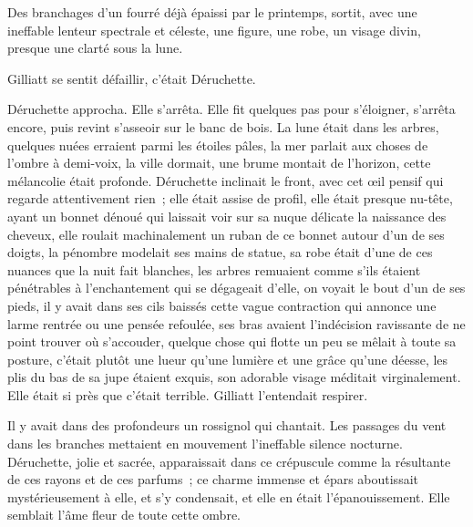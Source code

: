 \documentclass[french,twoside]{book} %
\begin{document}
Des branchages d’un fourré déjà épaissi par le printemps, sortit, avec une ineffable lenteur spectrale et céleste, une figure, une robe, un visage divin, presque une clarté sous la lune.\par
Gilliatt se sentit défaillir, c’était Déruchette.\par
Déruchette approcha. Elle s’arrêta. Elle fit quelques pas pour s’éloigner, s’arrêta encore, puis revint s’asseoir sur le banc de bois. La lune était dans les arbres, quelques nuées erraient parmi les étoiles pâles, la mer parlait aux choses de l’ombre à demi-voix, la ville  dormait, une brume montait de l’horizon, cette mélancolie était profonde. Déruchette inclinait le front, avec cet œil pensif qui regarde attentivement rien ; elle était assise de profil, elle était presque nu-tête, ayant un bonnet dénoué qui laissait voir sur sa nuque délicate la naissance des cheveux, elle roulait machinalement un ruban de ce bonnet autour d’un de ses doigts, la pénombre modelait ses mains de statue, sa robe était d’une de ces nuances que la nuit fait blanches, les arbres remuaient comme s’ils étaient pénétrables à l’enchantement qui se dégageait d’elle, on voyait le bout d’un de ses pieds, il y avait dans ses cils baissés cette vague contraction qui annonce une larme rentrée ou une pensée refoulée, ses bras avaient l’indécision ravissante de ne point trouver où s’accouder, quelque chose qui flotte un peu se mêlait à toute sa posture, c’était plutôt une lueur qu’une lumière et une grâce qu’une déesse, les plis du bas de sa jupe étaient exquis, son adorable visage méditait virginalement. Elle était si près que c’était terrible. Gilliatt l’entendait respirer.\par
Il y avait dans des profondeurs un rossignol qui chantait. Les passages du vent dans les branches mettaient en mouvement l’ineffable silence nocturne. Déruchette, jolie et sacrée, apparaissait dans ce crépuscule comme la résultante de ces rayons et de ces parfums ; ce charme immense et épars aboutissait mystérieusement à elle, et s’y condensait, et elle en était l’épanouissement. Elle semblait l’âme fleur de toute cette ombre.\par
\end{document}
